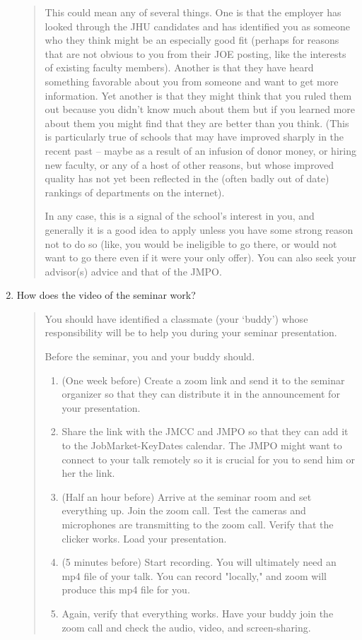 \documentclass{\classes/econtex}
\begin{document}
\begin{enumerate}
  \begin{quote}
    This could mean any of several things.  One is that the employer has looked through the JHU candidates and has identified you as someone who they think might be an especially good fit (perhaps for reasons that are not obvious to you from their JOE posting, like the interests of existing faculty members).  Another is that they have heard something favorable about you from someone and want to get more information.  Yet another is that they might think that you ruled them out because you didn't know much about them but if you learned more about them you might find that they are better than you think.  (This is particularly true of schools that may have improved sharply in the recent past -- maybe as a result of an infusion of donor money, or hiring new faculty, or any of a host of other reasons, but whose improved quality has not yet been reflected in the (often badly out of date) rankings of departments on the internet).

    In any case, this is a signal of the school's interest in you, and generally it is a good idea to apply unless you have some strong reason not to do so (like, you would be ineligible to go there, or would not want to go there even if it were your only offer).  You can also seek your advisor(s) advice and that of the JMPO.


  \end{quote}

\hypertarget{record-and-post-your-job-talk}{}
\item  How does the video of the seminar work?
  
  \begin{quote}
    You should have identified a classmate (your `buddy') whose
    responsibility will be to help you during your seminar presentation.
    
    Before the seminar, you and your buddy should.
    \begin{enumerate}
    	\item (One week before) Create a zoom link and send it to the seminar organizer so that they can distribute it in the announcement for your presentation.
    	\item Share the link with the JMCC and JMPO so that they can add it to the JobMarket-KeyDates calendar. The JMPO might want to connect to your talk remotely so it is crucial for you to send him or her the link.
    	\item (Half an hour before) Arrive at the seminar room and set everything up. Join the zoom call. Test the cameras and microphones are transmitting to the zoom call. Verify that the clicker works. Load your presentation.
    	\item (5 minutes before) Start recording. You will ultimately need an mp4 file of your talk. You can record "locally," and zoom will produce this mp4 file for you.
    	\item Again, verify that everything works. Have your buddy join the zoom call and check the audio, video, and screen-sharing.
    \end{enumerate}
    

\end{quote}
\end{enumerate}
\end{document}
